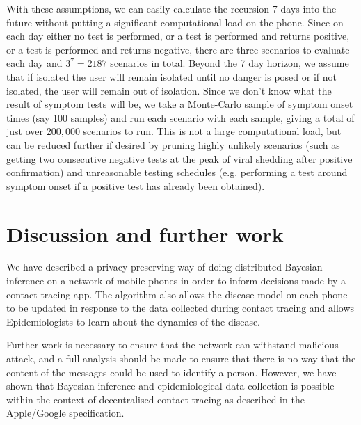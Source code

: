 \documentclass{article}
\begin{document}
With these assumptions, we can easily calculate the recursion 7 days into the future without putting a significant computational load on the phone. Since on each day either no test is performed, or a test is performed and returns positive, or a test is performed and returns negative, there are three scenarios to evaluate each day and $3^7 = 2187$ scenarios in total. Beyond the 7 day horizon, we assume that if isolated the user will remain isolated until no danger is posed or if not isolated, the user will remain out of isolation. Since we don't know what the result of symptom tests will be, we take a Monte-Carlo sample of symptom onset times (say 100 samples) and run each scenario with each sample, giving a total of just over $200,000$ scenarios to run. This is not a large computational load, but can be reduced further if desired by pruning highly unlikely scenarios (such as getting two consecutive negative tests at the peak of viral shedding after positive confirmation) and unreasonable testing schedules (e.g. performing a test around symptom onset if a positive test has already been obtained).

\section{Discussion and further work}

We have described a privacy-preserving way of doing distributed Bayesian inference on a network of mobile phones in order to inform decisions made by a contact tracing app. The algorithm also allows the disease model on each phone to be updated in response to the data collected during contact tracing and allows Epidemiologists to learn about the dynamics of the disease.

Further work is necessary to ensure that the network can withstand malicious attack, and a full analysis should be made to ensure that there is no way that the content of the messages could be used to identify a person. However, we have shown that Bayesian inference and epidemiological data collection is possible within the context of decentralised contact tracing as described in the Apple/Google specification.


%

%
%
% 
%

\end{document}
